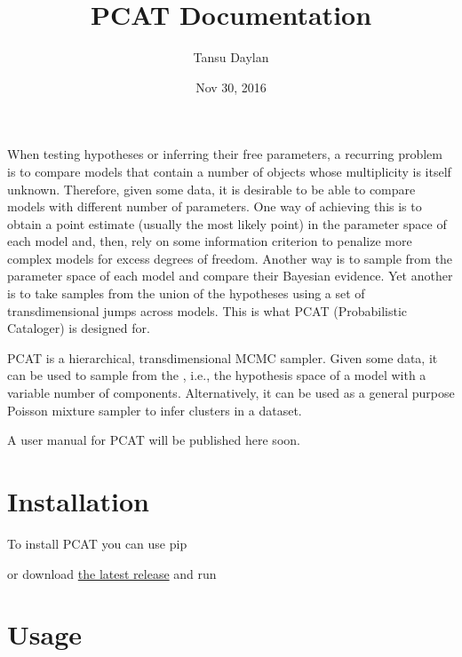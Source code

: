 \documentclass[letterpaper,10pt,english]{sphinxmanual}
\title{PCAT Documentation}
\date{Nov 30, 2016}
\author{Tansu Daylan}
\begin{document}
\maketitle
\sphinxtableofcontents
{}\label{index::doc}


When testing hypotheses or inferring their free parameters, a recurring problem is to compare models that contain a number of objects whose multiplicity is itself unknown. Therefore, given some data, it is desirable to be able to compare models with different number of parameters. One way of achieving this is to obtain a point estimate (usually the most likely point) in the parameter space of each model and, then, rely on some information criterion to penalize more complex models for excess degrees of freedom. Another way is to sample from the parameter space of each model and compare their Bayesian evidence. Yet another is to take samples from the union of the hypotheses using a set of transdimensional jumps across models. This is what PCAT (Probabilistic Cataloger) is designed for.

PCAT is a hierarchical, transdimensional MCMC sampler. Given some data, it can be used to sample from the , i.e., the hypothesis space of a model with a variable number of components. Alternatively, it can be used as a general purpose Poisson mixture sampler to infer clusters in a dataset.

A user manual for PCAT will be published here soon.


\chapter{Installation}
\label{index:installation}\label{index:welcome-to-pcat-s-documentation}
To install PCAT you can use pip

\begin{sphinxVerbatim}[commandchars=\\\{\}]
  
\end{sphinxVerbatim}

or download \href{https://github.com/tdaylan/pcat/releases/}{the latest release} and run

\begin{sphinxVerbatim}[commandchars=\\\{\}]
  
\end{sphinxVerbatim}


\chapter{Usage}
\label{index:usage}
\end{document}
